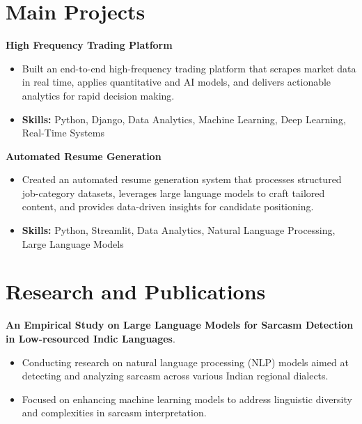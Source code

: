 \documentclass[a4paper,11pt]{article}
\begin{document}
\section{\textbf{Main Projects}}

\vspace{1mm}
  \textbf{High Frequency Trading Platform  }
\vspace{-1.5mm} %
\begin{itemize}
  \item Built an end-to-end high-frequency trading platform that scrapes market data in real time, applies quantitative and AI models, and delivers actionable analytics for rapid decision making.
\vspace{-3mm}
  \item \textbf{Skills:} Python, Django, Data Analytics, Machine Learning, Deep Learning, Real-Time Systems
\end{itemize}


\vspace{1mm}
   \textbf{Automated Resume Generation }
\vspace{-1.5mm} %
\begin{itemize}
  \item Created an automated resume generation system that processes structured job-category datasets, leverages large language models to craft tailored content, and provides data-driven insights for candidate positioning.
\vspace{-3mm}
  \item \textbf{Skills:} Python, Streamlit, Data Analytics, Natural Language Processing, Large Language Models
\end{itemize}



\section{\textbf{Research and Publications} \hfill }
\vspace{1mm}
  \textbf{An Empirical Study on Large Language Models for Sarcasm Detection in Low-resourced Indic Languages}.
\vspace{-1mm} %
\begin{itemize}
  \item Conducting research on natural language processing (NLP) models aimed at detecting and analyzing sarcasm across various Indian regional dialects.
\vspace{-3mm}
  \item Focused on enhancing machine learning models to address linguistic diversity and complexities in sarcasm interpretation.
\end{itemize}
\end{document}
